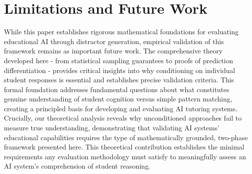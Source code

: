 \section{Limitations and Future Work}

While this paper establishes rigorous mathematical foundations for evaluating educational AI through distractor generation, empirical validation of this framework remains as important future work. The comprehensive theory developed here - from statistical sampling guarantees to proofs of prediction differentiation - provides critical insights into why conditioning on individual student responses is essential and establishes precise validation criteria. This formal foundation addresses fundamental questions about what constitutes genuine understanding of student cognition versus simple pattern matching, creating a principled basis for developing and evaluating AI tutoring systems. Crucially, our theoretical analysis reveals why unconditioned approaches fail to measure true understanding, demonstrating that validating AI systems' educational capabilities requires the type of mathematically grounded, two-phase framework presented here. This theoretical contribution establishes the minimal requirements any evaluation methodology must satisfy to meaningfully assess an AI system's comprehension of student reasoning.